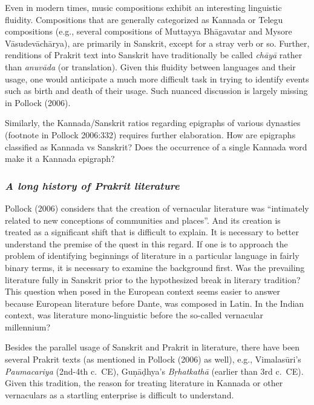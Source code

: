 Even in modern times, music compositions exhibit an interesting linguistic fluidity. Compositions that are generally categorized as Kannada or Telegu compositions (e.g., several compositions of Muttayya Bhāgavatar and Mysore Vāsudevāchārya), are primarily in Sanskrit, except for a stray verb or so. Further, renditions of Prakrit text into Sanskrit have traditionally be called {\sl chāyā} rather than {\sl anuvāda} (or translation). Given this fluidity between languages and their usage, one would anticipate a much more difficult task in trying to identify events such as birth and death of their usage. Such nuanced discussion is largely missing in Pollock (2006). 

Similarly, the Kannada/Sanskrit ratios regarding epigraphs of various dynasties (footnote in Pollock 2006:332) requires further elaboration. How are epigraphs classified as Kannada vs Sanskrit? Does the occurrence of a single Kannada word make it a Kannada epigraph?
\vskip -40pt

\subsubsection{{\sl A long history of Prakrit literature}}
\vskip -5pt

Pollock (2006) considers that the creation of vernacular literature was “intimately related to new conceptions of communities and places”. And its creation is treated as a significant shift that is difficult to explain. It is necessary to better understand the premise of the quest in this regard. If one is to approach the problem of identifying beginnings of literature in a particular language in fairly binary terms, it is necessary to examine the background first. Was the prevailing literature fully in Sanskrit prior to the hypothesized break in literary tradition? This question when posed in the European context seems easier to answer because European literature before Dante, was composed in Latin.  In the Indian context, was literature mono-linguistic before the so-called vernacular millennium?

Besides the parallel usage of Sanskrit and Prakrit in literature, there have been several Prakrit texts (as mentioned in Pollock (2006) as well), e.g., Vimalasūri’s {\sl Paumacariya} (2nd-4th c.\ CE), Guṇāḍhya’s {\sl Bṛhatkathā} (earlier than 3rd c.\ CE). Given this tradition, the reason for treating literature in Kannada or other vernaculars as a startling enterprise is difficult to understand.

